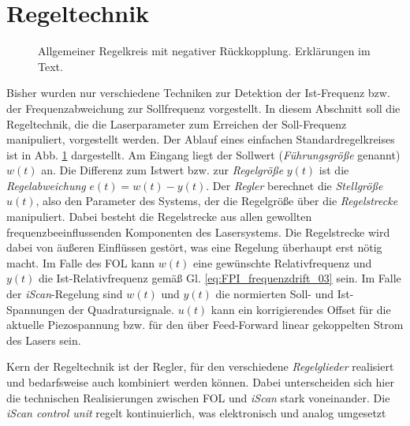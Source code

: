 \section{Regeltechnik}\label{sec:regeltechnik}
\begin{figure}[h]
 	\centering
	\caption[Regelkreis]{Allgemeiner Regelkreis mit
	negativer Rückkopplung. Erklärungen im Text.}
	\label{fig:regelkreis}
\end{figure}
Bisher wurden nur verschiedene Techniken zur Detektion der
Ist-Frequenz bzw. der Frequenzabweichung zur Sollfrequenz vorgestellt.
In diesem Abschnitt soll die Regeltechnik, die die Laserparameter zum Erreichen
der Soll-Frequenz manipuliert, vorgestellt werden. Der Ablauf eines
einfachen Standardregelkreises ist in Abb. \ref{fig:regelkreis} dargestellt. Am
Eingang liegt der Sollwert (\textit{Führungsgröße} genannt) $w(t)$ an. Die
Differenz zum Istwert bzw. zur \textit{Regelgröße} $y(t)$ ist die
\textit{Regelabweichung} $e(t)=w(t)-y(t)$. Der \textit{Regler} berechnet die
\textit{Stellgröße} $u(t)$, also den Parameter des Systems, der die Regelgröße
über die \textit{Regelstrecke} manipuliert. Dabei besteht die Regelstrecke aus
allen gewollten frequenzbeeinflussenden Komponenten des Lasersystems. Die
Regelstrecke wird dabei von äußeren Einflüssen gestört, was eine Regelung
überhaupt erst nötig macht. Im Falle des FOL kann $w(t)$ eine
gewünschte Relativfrequenz und $y(t)$ die Ist-Relativfrequenz gemäß Gl.
\eqref{eq:FPI_frequenzdrift_03} sein. Im Falle der \textit{iScan}-Regelung sind
$w(t)$ und $y(t)$ die normierten Soll- und Ist-Spannungen der Quadratursignale. $u(t)$
kann ein korrigierendes Offset für die aktuelle Piezospannung bzw. für den über
Feed-Forward linear gekoppelten Strom des Lasers sein.\par
Kern der Regeltechnik ist der Regler, für den verschiedene \textit{Regelglieder}
realisiert und bedarfsweise auch kombiniert werden können.
Dabei unterscheiden sich hier die technischen Realisierungen zwischen
FOL und \textit{iScan} stark voneinander. Die \textit{iScan
control unit} regelt kontinuierlich, was elektronisch und analog umgesetzt
